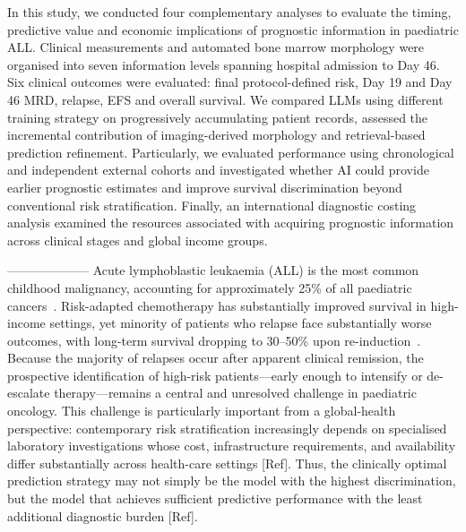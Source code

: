\documentclass[pdflatex,sn-nature]{sn-jnl}
\begin{document}
In this study, we conducted four complementary analyses to evaluate the timing, predictive value and economic implications of prognostic information in paediatric ALL. Clinical measurements and automated bone marrow morphology were organised into seven information levels spanning hospital admission to Day 46. Six clinical outcomes were evaluated: final protocol-defined risk, Day 19 and Day 46 MRD, relapse, EFS and overall survival. We compared  LLMs using different training strategy on progressively accumulating patient records, assessed the incremental contribution of imaging-derived morphology and retrieval-based prediction refinement. Particularly, we evaluated performance using chronological and independent external cohorts and investigated whether AI could provide earlier prognostic estimates and improve survival discrimination beyond conventional risk stratification. Finally, an international diagnostic costing analysis examined the resources associated with acquiring prognostic information across clinical stages and global income groups. 



\iffalse
--------------------
Acute lymphoblastic leukaemia (ALL) is the most common childhood
malignancy, accounting for approximately 25\% of all paediatric
cancers~\cite{[CITE:Hunger2015]}.
Risk-adapted chemotherapy has substantially improved survival in
high-income settings, yet minority of patients who relapse face substantially worse outcomes, with long-term
survival dropping to 30--50\% upon re-induction~\cite{[CITE:Bhojwani2013],[CITE:Pui2008]}.
Because the majority of relapses occur after apparent clinical
remission, the prospective identification of high-risk patients—early
enough to intensify or de-escalate therapy—remains a central and
unresolved challenge in paediatric oncology. This challenge is
particularly important from a global-health perspective: contemporary
risk stratification increasingly depends on specialised laboratory
investigations whose cost, infrastructure requirements, and
availability differ substantially across health-care settings [Ref]. Thus,
the clinically optimal prediction strategy may not simply be the model
with the highest discrimination, but the model that achieves sufficient
predictive performance with the least additional diagnostic burden [Ref].
\end{document}
